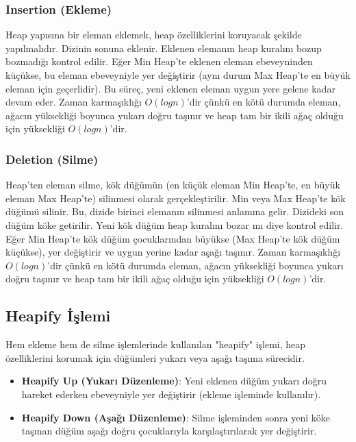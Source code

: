 \subsubsection{Insertion (Ekleme)}

Heap yapısına bir eleman eklemek, heap özelliklerini koruyacak şekilde yapılmalıdır. Dizinin sonuna eklenir. Eklenen elemanın heap kuralını bozup bozmadığı kontrol edilir. Eğer Min Heap'te eklenen eleman ebeveyninden küçükse, bu eleman ebeveyniyle yer değiştirir (aynı durum Max Heap'te en büyük eleman için geçerlidir). Bu süreç, yeni eklenen eleman uygun yere gelene kadar devam eder. Zaman karmaşıklığı $O(logn)$'dir çünkü en kötü durumda eleman, ağacın yüksekliği boyunca yukarı doğru taşınır ve heap tam bir ikili ağaç olduğu için yüksekliği $O(logn)$'dir.

\subsubsection{Deletion (Silme)}

Heap’ten eleman silme, kök düğümün (en küçük eleman Min Heap’te, en büyük eleman Max Heap’te) silinmesi olarak gerçekleştirilir. Min veya Max Heap'te kök düğümü silinir. Bu, dizide birinci elemanın silinmesi anlamına gelir. Dizideki son düğüm köke getirilir. Yeni kök düğüm heap kuralını bozar mı diye kontrol edilir. Eğer Min Heap'te kök düğüm çocuklarından büyükse (Max Heap'te kök düğüm küçükse), yer değiştirir ve uygun yerine kadar aşağı taşınır. Zaman karmaşıklığı $O(logn)$'dir çünkü en kötü durumda eleman, ağacın yüksekliği boyunca yukarı doğru taşınır ve heap tam bir ikili ağaç olduğu için yüksekliği $O(logn)$'dir.

\subsection{Heapify İşlemi}

Hem ekleme hem de silme işlemlerinde kullanılan "heapify" işlemi, heap özelliklerini korumak için düğümleri yukarı veya aşağı taşıma sürecidir.

\begin{itemize}
    \item \textbf{Heapify Up (Yukarı Düzenleme)}: Yeni eklenen düğüm yukarı doğru hareket ederken ebeveyniyle yer değiştirir (ekleme işleminde kullanılır).
    \item \textbf{Heapify Down (Aşağı Düzenleme)}: Silme işleminden sonra yeni köke taşınan düğüm aşağı doğru çocuklarıyla karşılaştırılarak yer değiştirir.
\end{itemize}

